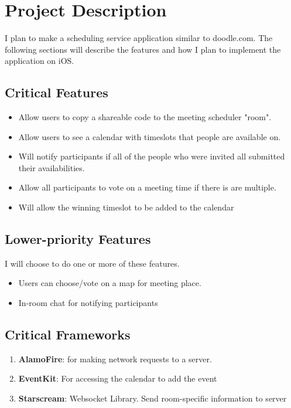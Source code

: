 \documentclass[11pt]{article}
\author{Andrew Chen}
\date{\today}
\title{}
\begin{document}
\tableofcontents

\section{Project Description}
\label{sec:orgd2998c7}

I plan to make a scheduling service application similar to doodle.com. The following sections will
describe the features and how I plan to implement the application on iOS.

\subsection{Critical Features}
\label{sec:org06252d3}

\begin{itemize}
\item Allow users to copy a shareable code to the meeting scheduler "room".
\item Allow users to see a calendar with timeslots that people are available on.
\item Will notify participants if all of the people who were invited all submitted their availabilities.
\item Allow all participants to vote on a meeting time if there is are multiple.
\item Will allow the winning timeslot to be added to the calendar
\end{itemize}

\subsection{Lower-priority Features}
\label{sec:org14a2ebd}

I will choose to do one or more of these features.

\begin{itemize}
\item Users can choose/vote on a map for meeting place.
\item In-room chat for notifying participants
\end{itemize}

\subsection{Critical Frameworks}
\label{sec:org114016f}

\begin{enumerate}
\item \textbf{AlamoFire}: for making network requests to a server.
\item \textbf{EventKit}: For accessing the calendar to add the event
\item \textbf{Starscream}: Websocket Library. Send room-specific information to server
\end{enumerate}
\end{document}
